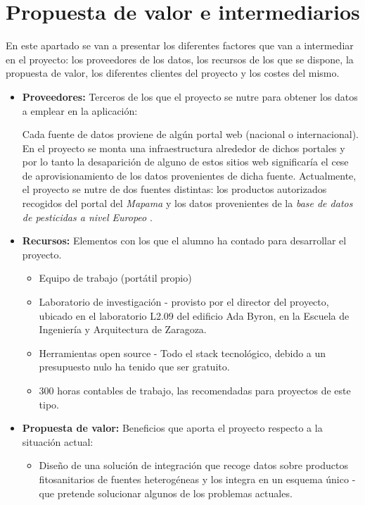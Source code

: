 \section{Propuesta de valor e intermediarios} \label{analisis.marco}
En este apartado se van a presentar los diferentes factores que van a intermediar en el proyecto: los proveedores de los datos, los recursos de los que se dispone, la propuesta de valor, los diferentes clientes del proyecto y los costes del mismo. \par
\begin{itemize}
\item \textbf{Proveedores:} Terceros de los que el proyecto se nutre para obtener los datos a emplear en la aplicación: \par Cada fuente de datos proviene de algún portal web (nacional o internacional). En el proyecto se monta una infraestructura alrededor de dichos portales y por lo tanto la desaparición de alguno de estos sitios web significaría el cese de aprovisionamiento de los datos provenientes de dicha fuente. Actualmente, el proyecto se nutre de dos fuentes distintas: los productos autorizados recogidos del portal del \textit{Mapama} \cite{mapama} y los datos provenientes de la \textit{base de datos de pesticidas a nivel Europeo} \cite{pesticidesdb}.
\item \textbf{Recursos:} Elementos con los que el alumno ha contado para desarrollar el proyecto. 
\begin{itemize}
\item Equipo de trabajo (portátil propio)
\item Laboratorio de investigación - provisto por el director del proyecto, ubicado en el laboratorio L2.09 del edificio Ada Byron, en la Escuela de Ingeniería y Arquitectura de Zaragoza.
\item Herramientas open source - Todo el stack tecnológico, debido a un presupuesto nulo ha tenido que ser gratuito.
\item 300 horas contables de trabajo, las recomendadas para proyectos de este tipo.
\end{itemize}
\item \textbf{Propuesta de valor:} Beneficios que aporta el proyecto respecto a la situación actual:
\begin{itemize}
\item Diseño de una solución de integración que recoge datos sobre productos fitosanitarios de fuentes heterogéneas y los integra en un esquema único - que pretende solucionar algunos de los problemas actuales.

\end{itemize}
\end{itemize}
